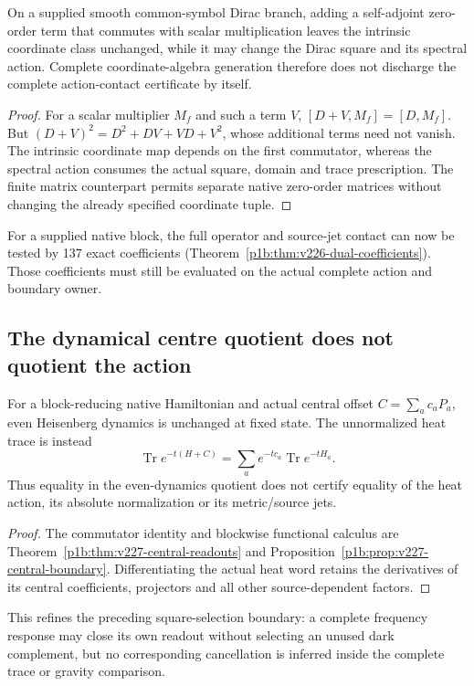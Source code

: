 \documentclass[12pt,a4paper]{article}
\begin{document}
\begin{proposition}
\label{p3b:prop:v226-square-scope}
On a supplied smooth common-symbol Dirac branch, adding a self-adjoint
zero-order term that commutes with scalar multiplication leaves the intrinsic
coordinate class unchanged, while it may change the Dirac square and its
spectral action. Complete coordinate-algebra generation therefore does not
discharge the complete action-contact certificate by itself.
\end{proposition}
\begin{proof}
For a scalar multiplier $M_f$ and such a term $V$,
$[D+V,M_f]=[D,M_f]$. But
$(D+V)^2=D^2+DV+VD+V^2$, whose additional terms need not vanish.
The intrinsic coordinate map depends on the first commutator, whereas the
spectral action consumes the actual square, domain and trace prescription.
The finite matrix counterpart permits separate native zero-order matrices
without changing the already specified coordinate tuple.
\end{proof}
For a supplied native block, the full operator and source-jet contact can
now be tested by 137 exact coefficients
(Theorem~\ref{p1b:thm:v226-dual-coefficients}). Those coefficients must
still be evaluated on the actual complete action and boundary owner.


\subsection{The dynamical centre quotient does not quotient the action}
\label{p3b:sec:v227-action-centre}
\begin{proposition}
\label{p3b:prop:v227-action-centre}
For a block-reducing native Hamiltonian and actual central offset
$C=\sum_ac_aP_a$, even Heisenberg dynamics is unchanged at fixed state.
The unnormalized heat trace is instead
\[
 \operatorname{Tr}e^{-t(H+C)}
 =\sum_a e^{-tc_a}\operatorname{Tr}e^{-tH_a}.
\]
Thus equality in the even-dynamics quotient does not certify equality of
the heat action, its absolute normalization or its metric/source jets.
\end{proposition}
\begin{proof}
The commutator identity and blockwise functional calculus are
Theorem~\ref{p1b:thm:v227-central-readouts} and
Proposition~\ref{p1b:prop:v227-central-boundary}. Differentiating the
actual heat word retains the derivatives of its central coefficients,
projectors and all other source-dependent factors.
\end{proof}
This refines the preceding square-selection boundary: a complete frequency
response may close its own readout without selecting an unused dark
complement, but no corresponding cancellation is inferred inside the
complete trace or gravity comparison.
\end{document}
